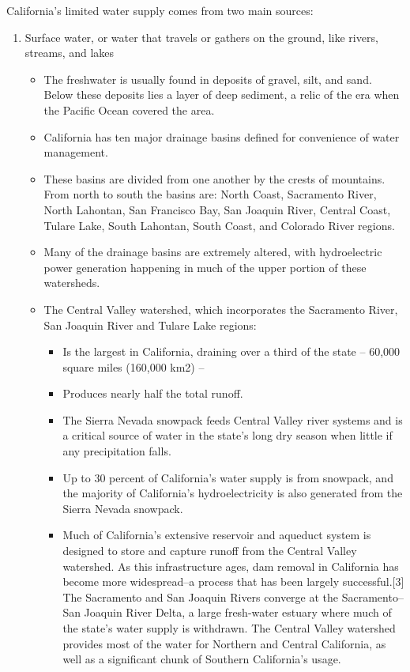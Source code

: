 \documentclass{article}
\begin{document}
California's limited water supply comes from two main sources: 
\begin{enumerate}
\item Surface water, or water that travels or gathers on the ground, like rivers, streams, and lakes
\begin{itemize}
\item The freshwater is usually found in deposits of gravel, silt, and sand. Below these deposits lies a layer of deep sediment, a relic of the era when the Pacific Ocean covered the area.
\item California has ten major drainage basins defined for convenience of water management. 
\item These basins are divided from one another by the crests of mountains. From north to south the basins are: North Coast, Sacramento River, North Lahontan, San Francisco Bay, San Joaquin River, Central Coast, Tulare Lake, South Lahontan, South Coast, and Colorado River regions.
\item Many of the drainage basins are extremely altered, with hydroelectric power generation happening in much of the upper portion of these watersheds.
\item The Central Valley watershed, which incorporates the Sacramento River, San Joaquin River and Tulare Lake regions:
\begin{itemize}
\item Is the largest in California, draining over a third of the state – 60,000 square miles (160,000 km2) – 
\item Produces nearly half the total runoff.
\item The Sierra Nevada snowpack feeds Central Valley river systems and is a critical source of water in the state's long dry season when little if any precipitation falls. 
\item Up to 30 percent of California's water supply is from snowpack, and the majority of California's hydroelectricity is also generated from the Sierra Nevada snowpack.
\item Much of California's extensive reservoir and aqueduct system is designed to store and capture runoff from the Central Valley watershed. As this infrastructure ages, dam removal in California has become more widespread--a process that has been largely successful.[3] The Sacramento and San Joaquin Rivers converge at the Sacramento–San Joaquin River Delta, a large fresh-water estuary where much of the state's water supply is withdrawn. The Central Valley watershed provides most of the water for Northern and Central California, as well as a significant chunk of Southern California's usage.

\end{itemize}
\end{itemize}
\end{enumerate}
\end{document}
